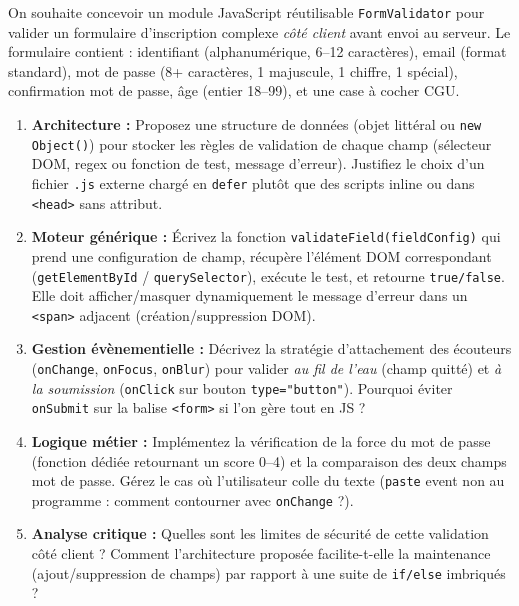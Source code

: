 \documentclass[11pt]{article}
\begin{document}
\begin{exercice}
On souhaite concevoir un module JavaScript réutilisable \texttt{FormValidator} pour valider un formulaire d'inscription complexe \textit{côté client} avant envoi au serveur. Le formulaire contient : identifiant (alphanumérique, 6--12 caractères), email (format standard), mot de passe (8+ caractères, 1 majuscule, 1 chiffre, 1 spécial), confirmation mot de passe, âge (entier 18--99), et une case à cocher CGU.
\begin{enumerate}
    \item \textbf{Architecture :} Proposez une structure de données (objet littéral ou \texttt{new Object()}) pour stocker les règles de validation de chaque champ (sélecteur DOM, regex ou fonction de test, message d'erreur). Justifiez le choix d'un fichier \texttt{.js} externe chargé en \texttt{defer} plutôt que des scripts inline ou dans \texttt{<head>} sans attribut.
    \item \textbf{Moteur générique :} Écrivez la fonction \texttt{validateField(fieldConfig)} qui prend une configuration de champ, récupère l'élément DOM correspondant (\texttt{getElementById} / \texttt{querySelector}), exécute le test, et retourne \texttt{true/false}. Elle doit afficher/masquer dynamiquement le message d'erreur dans un \texttt{<span>} adjacent (création/suppression DOM).
    \item \textbf{Gestion évènementielle :} Décrivez la stratégie d'attachement des écouteurs (\texttt{onChange}, \texttt{onFocus}, \texttt{onBlur}) pour valider \textit{au fil de l'eau} (champ quitté) et \textit{à la soumission} (\texttt{onClick} sur bouton \texttt{type="button"}). Pourquoi éviter \texttt{onSubmit} sur la balise \texttt{<form>} si l'on gère tout en JS ?
    \item \textbf{Logique métier :} Implémentez la vérification de la force du mot de passe (fonction dédiée retournant un score 0--4) et la comparaison des deux champs mot de passe. Gérez le cas où l'utilisateur colle du texte (\texttt{paste} event non au programme : comment contourner avec \texttt{onChange} ?).
    \item \textbf{Analyse critique :} Quelles sont les limites de sécurité de cette validation côté client ? Comment l'architecture proposée facilite-t-elle la maintenance (ajout/suppression de champs) par rapport à une suite de \texttt{if/else} imbriqués ?
\end{enumerate}
\end{exercice}
\end{document}
